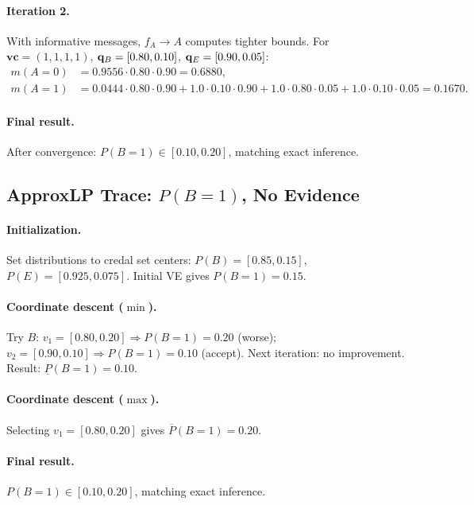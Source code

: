 \documentclass{article}
\begin{document}
\paragraph{Iteration 2.} With informative messages, $f_A \to A$ computes tighter bounds. For $\mathbf{vc} = (1,1,1,1)$, $\mathbf{q}_B = [0.80, 0.10]$, $\mathbf{q}_E = [0.90, 0.05]$:
\begin{align*}
  m(A{=}0) &= 0.9556 \cdot 0.80 \cdot 0.90 = 0.6880, \\
  m(A{=}1) &= 0.0444 \cdot 0.80 \cdot 0.90 + 1.0 \cdot 0.10 \cdot 0.90 + 1.0 \cdot 0.80 \cdot 0.05 + 1.0 \cdot 0.10 \cdot 0.05 = 0.1670.
\end{align*}

\paragraph{Final result.} After convergence: $P(B{=}1) \in [0.10, 0.20]$, matching exact inference.

\subsection{ApproxLP Trace: $P(B{=}1)$, No Evidence}

\paragraph{Initialization.} Set distributions to credal set centers: $P(B) = [0.85, 0.15]$, $P(E) = [0.925, 0.075]$. Initial VE gives $P(B{=}1) = 0.15$.

\paragraph{Coordinate descent ($\min$).} Try $B$: $v_1 = [0.80, 0.20] \Rightarrow P(B{=}1) = 0.20$ (worse); $v_2 = [0.90, 0.10] \Rightarrow P(B{=}1) = 0.10$ (accept). Next iteration: no improvement. Result: $\underline{P}(B{=}1) = 0.10$.

\paragraph{Coordinate descent ($\max$).} Selecting $v_1 = [0.80, 0.20]$ gives $\overline{P}(B{=}1) = 0.20$.

\paragraph{Final result.} $P(B{=}1) \in [0.10, 0.20]$, matching exact inference.



\newpage

\end{document}
